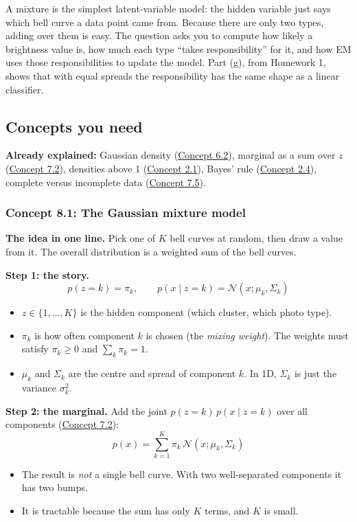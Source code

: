 \documentclass[12pt,a4paper]{article}
\begin{document}
A mixture is the simplest latent-variable model: the hidden variable just says which bell curve a data point came from. Because there are only two types, adding over them is easy. The question asks you to compute how likely a brightness value is, how much each type ``takes responsibility'' for it, and how EM uses those responsibilities to update the model. Part (g), from Homework 1, shows that with equal spreads the responsibility has the same shape as a linear classifier.

\subsection{Concepts you need}

\textbf{Already explained:} Gaussian density (\hyperref[c6-2]{Concept 6.2}), marginal as a sum over $z$ (\hyperref[c7-2]{Concept 7.2}), densities above 1 (\hyperref[c2-1]{Concept 2.1}), Bayes' rule (\hyperref[c2-4]{Concept 2.4}), complete versus incomplete data (\hyperref[c7-5]{Concept 7.5}).

\subsubsection{Concept 8.1: The Gaussian mixture model}\label{c8-1}

\textbf{The idea in one line.} Pick one of $K$ bell curves at random, then draw a value from it. The overall distribution is a weighted sum of the bell curves.

\textbf{Step 1: the story.}
\[
p(z=k)=\pi_k,\qquad p(x\mid z=k)=\mathcal{N}(x;\mu_k,\Sigma_k)
\]
\begin{itemize}[nosep]
  \item $z\in\{1,\dots,K\}$ is the hidden component (which cluster, which photo type).
  \item $\pi_k$ is how often component $k$ is chosen (the \emph{mixing weight}). The weights must satisfy $\pi_k\ge0$ and $\sum_k\pi_k=1$.
  \item $\mu_k$ and $\Sigma_k$ are the centre and spread of component $k$. In 1D, $\Sigma_k$ is just the variance $\sigma_k^2$.
\end{itemize}

\textbf{Step 2: the marginal.} Add the joint $p(z=k)\,p(x\mid z=k)$ over all components (\hyperref[c7-2]{Concept 7.2}):
\[
p(x)=\sum_{k=1}^{K}\pi_k\,\mathcal{N}(x;\mu_k,\Sigma_k)
\]
\begin{itemize}[nosep]
  \item The result is \emph{not} a single bell curve. With two well-separated components it has two bumps.
  \item It is tractable because the sum has only $K$ terms, and $K$ is small.
\end{itemize}
\end{document}
